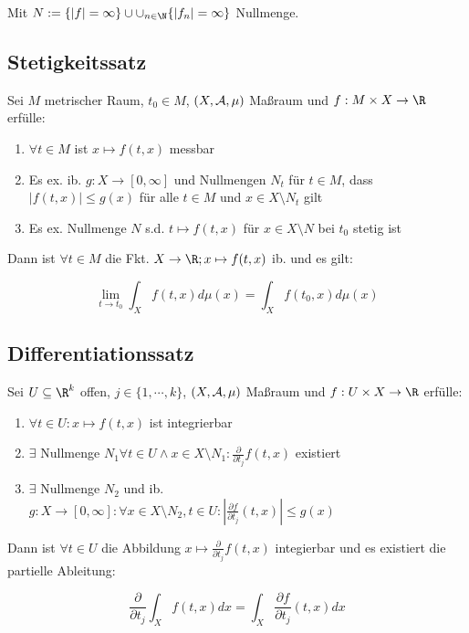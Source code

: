 Mit $N := \{|f| = \infty\} \cup \cup_{n \in \N} \{|f_n| = \infty\}$ Nullmenge.

\subsection*{Stetigkeitssatz}

Sei $M$ metrischer Raum, $t_0 \in M$, $(X,\mathcal{A},\mu)$ Maßraum und $f : M \times X \to \R$ erfülle:

\begin{enumerate}[label=(\alph*)]
	\item $\forall t \in M$ ist $x \mapsto f(t,x)$ messbar
	\item Es ex. ib. $g : X \to [0,\infty]$ und Nullmengen $N_t$ für $t \in M$, dass $|f(t,x)| \leq g(x)$ für alle $t \in M$ und $x \in X \setminus N_t$ gilt
	\item Es ex. Nullmenge $N$ s.d. $t \mapsto f(t,x)$ für $x \in X \setminus N$ bei $t_0$ stetig ist
\end{enumerate}

Dann ist $\forall t \in M$ die Fkt. $X \to \R; x \mapsto f(t,x)$ ib. und es gilt:

\vspace{-2mm}
\[ \lim_{t \to t_0} \int_X f(t,x) d\mu(x) = \int_X f(t_0,x) d\mu(x) \]

\subsection*{Differentiationssatz}

Sei $U \subseteq \R^k$ offen, $j \in \{1,\cdots,k\}$, $(X,\mathcal{A},\mu)$ Maßraum und $f : U \times X \to \R$ erfülle:

\begin{enumerate}[label=(\alph*)]
	\item $\forall t \in U : x \mapsto f(t,x)$ ist integrierbar
	\item $\exists$ Nullmenge $N_1 \forall t \in U \land x \in X \setminus N_1 : \frac{\partial}{\partial t_j} f(t,x)$ existiert
	\item $\exists$ Nullmenge $N_2$ und ib. $g : X \to [0,\infty] : \forall x \in X \setminus N_2, t \in U : |\frac{\partial f}{\partial t_j} (t,x)| \leq g(x)$
\end{enumerate}

Dann ist $\forall t \in U$ die Abbildung $x \mapsto \frac{\partial}{\partial t_j} f(t,x)$ integierbar und es existiert die partielle Ableitung:

\[ \frac{\partial}{\partial t_j} \int_X f(t,x) dx = \int_X \frac{\partial f}{\partial t_j} (t,x) dx \]

